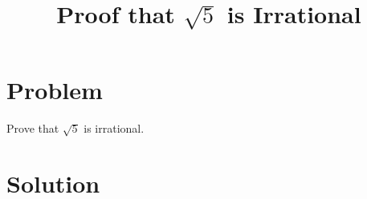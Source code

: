 \documentclass{article}
\title{Proof that $\sqrt{5}$ is Irrational}
\date{}
\begin{document}
\maketitle

\section*{Problem}
Prove that $\sqrt{5}$ is irrational.

\section*{Solution}

\end{document}
